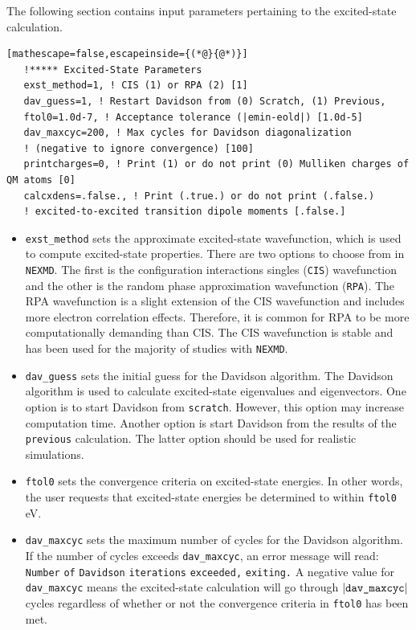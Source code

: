 \documentclass[letterpaper,12pt,titlepage]{article}
\begin{document}
\noindent The following section contains input parameters pertaining to the excited-state calculation.
\begin{lstlisting}[mathescape=false,escapeinside={(*@}{@*)}]
   !***** Excited-State Parameters
   exst_method=1, ! CIS (1) or RPA (2) [1]
   dav_guess=1, ! Restart Davidson from (0) Scratch, (1) Previous, 
   ftol0=1.0d-7, ! Acceptance tolerance (|emin-eold|) [1.0d-5]
   dav_maxcyc=200, ! Max cycles for Davidson diagonalization 
   ! (negative to ignore convergence) [100]
   printcharges=0, ! Print (1) or do not print (0) Mulliken charges of QM atoms [0]
   calcxdens=.false., ! Print (.true.) or do not print (.false.) 
   ! excited-to-excited transition dipole moments [.false.]
\end{lstlisting}
\begin{itemize}
\item \verb+exst_method+ sets the approximate excited-state wavefunction, which is used to compute excited-state properties.  There are two options to choose from in \verb+NEXMD+.  The first is the configuration interactions singles (\verb+CIS+) wavefunction and the other is the random phase approximation wavefunction (\verb+RPA+).  The RPA wavefunction is a slight extension of the CIS wavefunction and includes more electron correlation effects.  Therefore, it is common for RPA to be more computationally demanding than CIS.  The CIS wavefunction is stable and has been used for the majority of studies with \verb+NEXMD+.
\item \verb+dav_guess+ sets the initial guess for the Davidson algorithm.  The Davidson algorithm is used to calculate excited-state eigenvalues and eigenvectors.  One option is to start Davidson from \verb+scratch+.  However, this option may increase computation time.  Another option is start Davidson from the results of the \verb+previous+ calculation.  The latter option should be used for realistic simulations.
\item \verb+ftol0+ sets the convergence criteria on excited-state energies.  In other words, the user requests that excited-state energies be determined to within \verb+ftol0+ eV.
\item \verb+dav_maxcyc+ sets the maximum number of cycles for the Davidson algorithm.  If the number of cycles exceeds \verb+dav_maxcyc+, an error message will read: \verb+Number+ \verb+of+ \verb+Davidson+ \verb+iterations+ \verb+exceeded,+ \verb+exiting.+  A negative value for \verb+dav_maxcyc+ means the excited-state calculation will go through $\left|\verb+dav_maxcyc+\right|$ cycles regardless of whether or not the convergence criteria in \verb+ftol0+ has been met.

\end{itemize}
\end{document}
